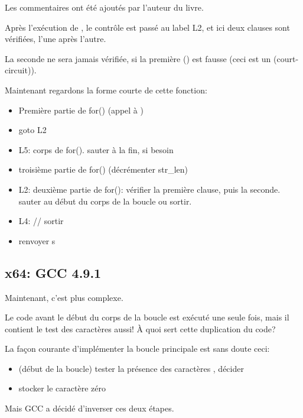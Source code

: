 

Les commentaires ont été ajoutés par l'auteur du livre.

Après l'exécution de \strlen{}, le contrôle est passé au label L2, et ici deux clauses
sont vérifiées, l'une après l'autre.

La seconde ne sera jamais vérifiée, si la première () est fausse
(ceci est un  (court-circuit)).

Maintenant regardons la forme courte de cette fonction:

\begin{itemize}
\item Première partie de for() (appel à \strlen{})
\item goto L2
\item L5: corps de for(). sauter à la fin, si besoin
\item troisième partie de for() (décrémenter str\_len)
\item L2: 
deuxième partie de for(): vérifier la première clause, puis la seconde. sauter au
début du corps de la boucle ou sortir.
\item L4: // sortir
\item renvoyer s
\end{itemize}

\subsection{x64: GCC 4.9.1 \Optimizing}
\label{string_trim_GCC_x64_O3}



Maintenant, c'est plus complexe.

Le code avant le début du corps de la boucle est exécuté une seule fois, mais il contient
le test des caractères \CRLF{} aussi!
À quoi sert cette duplication du code?

La façon courante d'implémenter la boucle principale est sans doute ceci:

\begin{itemize}
\item (début de la boucle) tester la présence des caractères \CRLF{}, décider
\item stocker le caractère zéro
\end{itemize}

Mais GCC a décidé d'inverser ces deux étapes.

